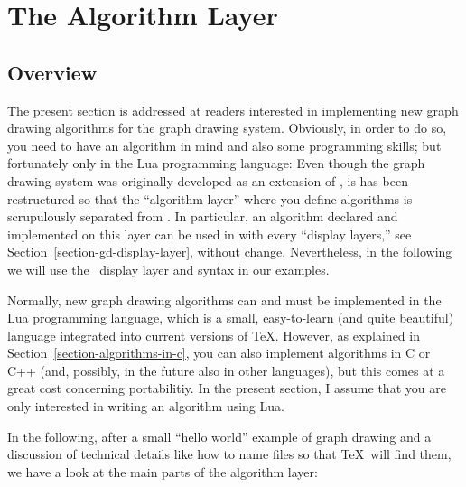 %
%
%


\section{The Algorithm Layer}

\label{section-gd-algorithm-layer}



\subsection{Overview}

The present section is addressed at readers interested in implementing
new graph drawing algorithms for the graph drawing system. Obviously,
in order to do so, you need to have an algorithm in mind and also some
programming skills; but fortunately only in the Lua programming
language: Even though the graph drawing system was originally
developed as an extension of \tikzname, is has been restructured so
that the ``algorithm layer'' where you define algorithms is
scrupulously separated from \tikzname. In particular, an algorithm
declared and implemented on this layer can be used in with every ``display
layers,'' see Section~\ref{section-gd-display-layer}, without change. Nevertheless, in
the following we will use the \tikzname\ display layer and syntax in
our examples.

Normally, new graph drawing algorithms can and must be implemented in
the Lua programming language, which is a small, easy-to-learn (and
quite beautiful) language integrated into current versions of
\TeX. However, as explained in Section~\ref{section-algorithms-in-c},
you can also implement algorithms in C or C++ (and, possibly, in the
future also in other languages), but this comes at a great cost
concerning portabilitiy. In the present section, I assume that you are
only interested in writing an algorithm using Lua.

In the following, after a small ``hello world'' example of graph
drawing and a discussion of technical details like
how to name files so that \TeX\ will find them, we have a look at the
main parts of the algorithm layer:

